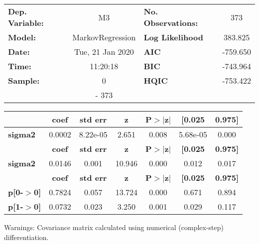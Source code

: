 \begin{center}
\begin{tabular}{lclc}
\toprule
\textbf{Dep. Variable:} &        M3        & \textbf{  No. Observations:  } &    373      \\
\textbf{Model:}         & MarkovRegression & \textbf{  Log Likelihood     } &  383.825    \\
\textbf{Date:}          & Tue, 21 Jan 2020 & \textbf{  AIC                } &  -759.650   \\
\textbf{Time:}          &     11:20:18     & \textbf{  BIC                } &  -743.964   \\
\textbf{Sample:}        &        0         & \textbf{  HQIC               } &  -753.422   \\
\textbf{}               &       - 373      & \textbf{                     } &             \\
\bottomrule
\end{tabular}
\begin{tabular}{lcccccc}
                & \textbf{coef} & \textbf{std err} & \textbf{z} & \textbf{P$>$$|$z$|$} & \textbf{[0.025} & \textbf{0.975]}  \\
\midrule
\textbf{sigma2} &       0.0002  &     8.22e-05     &     2.651  &         0.008        &     5.68e-05    &        0.000     \\
                & \textbf{coef} & \textbf{std err} & \textbf{z} & \textbf{P$>$$|$z$|$} & \textbf{[0.025} & \textbf{0.975]}  \\
\midrule
\textbf{sigma2} &       0.0146  &        0.001     &    10.946  &         0.000        &        0.012    &        0.017     \\
                   & \textbf{coef} & \textbf{std err} & \textbf{z} & \textbf{P$>$$|$z$|$} & \textbf{[0.025} & \textbf{0.975]}  \\
\midrule
\textbf{p[0-$>$0]} &       0.7824  &        0.057     &    13.724  &         0.000        &        0.671    &        0.894     \\
\textbf{p[1-$>$0]} &       0.0732  &        0.023     &     3.250  &         0.001        &        0.029    &        0.117     \\
\bottomrule
\end{tabular}
\end{center}

Warnings: \newline
 [1] Covariance matrix calculated using numerical (complex-step) differentiation.